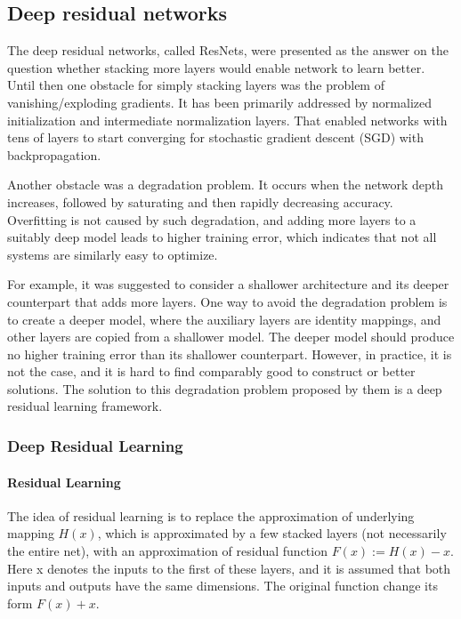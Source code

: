 \documentclass[
]{krantz}
\begin{document}
\hypertarget{deep-residual-networks}{%
\subsection{Deep residual networks}\label{deep-residual-networks}}

The deep residual networks, called ResNets, \citep{esnet} were presented as the answer on the question whether stacking more layers would enable network to learn better. Until then one obstacle for simply stacking layers was the problem of vanishing/exploding gradients. It has been primarily addressed by normalized initialization and intermediate normalization layers. That enabled networks with tens of layers to start converging for stochastic gradient descent (SGD) with backpropagation.

Another obstacle was a degradation problem. It occurs when the network depth increases, followed by saturating and then rapidly decreasing accuracy. Overfitting is not caused by such degradation, and adding more layers to a suitably deep model leads to higher training error, which indicates that not all systems are similarly easy to optimize.

For example, it was suggested to consider a shallower architecture and its deeper counterpart that adds more layers. One way to avoid the degradation problem is to create a deeper model, where the auxiliary layers are identity mappings, and other layers are copied from a shallower model. The deeper model should produce no higher training error than its shallower counterpart. However, in practice, it is not the case, and it is hard to find comparably good to construct or better solutions. The solution to this degradation problem proposed by them is a deep residual learning framework.

\hypertarget{deep-residual-learning}{%
\subsubsection{Deep Residual Learning}\label{deep-residual-learning}}

\hypertarget{residual-learning}{%
\paragraph{Residual Learning}\label{residual-learning}}

The idea of residual learning is to replace the approximation of underlying mapping \(H\left( x\right)\), which is approximated by a few stacked layers (not necessarily the entire net), with an approximation of residual function \(F(x):= H\left( x \right) − x\). Here x denotes the inputs to the first of these layers, and it is assumed that both inputs and outputs have the same dimensions. The original function change its form \(F\left( x \right)+x\).
\end{document}
